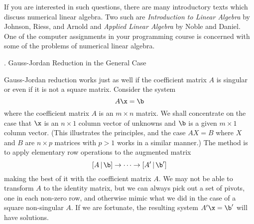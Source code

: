 If you are interested in such questions, there are many introductory
texts which discuss numerical linear algebra.   
Two such are {\it Introduction to Linear Algebra\/} by Johnson, Riess,
and Arnold  and
{\it Applied Linear Algebra\/} by Noble and Daniel.   One of the
computer assignments in your programming course is concerned
with some of the problems of numerical linear algebra.
\bigskip

\bigskip
{}
\head \sn.  Gauss-Jordan Reduction in the General Case \endhead

Gauss-Jordan reduction works just as well if the coefficient
matrix $A$ is singular or even if it is not a square matrix.
Consider the system
$$
  A\x = \b
$$
where the coefficient matrix $A$ is an $m\times n$ matrix.
We shall concentrate on the case that $\x$ is an $n\times 1$
column vector of unknowns and $\b$ is a given $m\times 1$
column vector.  (This illustrates the principles, and the
case $AX=B$ where $X$ and $B$ are $n\times p$ matrices with
$p > 1$ works in a similar manner.)  The method is to apply
elementary row operations to the augmented matrix
$$
[A\,|\,\b] \to \dots \to [A'\, |\, \b']
$$
making the best of it with the coefficient matrix $A$.
We may not be able to transform $A$ to the identity matrix,
but we can always pick out a set of pivots, one in each non-zero
row, and otherwise mimic what we did in the case of a square
non-singular $A$.   If we are fortunate, the resulting system
$A'\x = \b'$ will have solutions.

